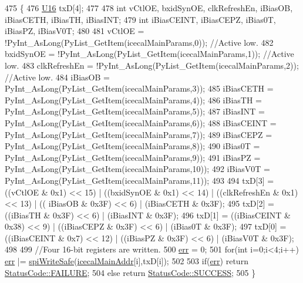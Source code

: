 \begin{DoxyCode}
475 \{                            
476     \hyperlink{ICECALv3_8h_adf928e51a60dba0df29d615401cc55a8}{U16} txD[4];
477 
478     \textcolor{keywordtype}{int} vCtlOE, bxidSynOE, clkRefreshEn, iBiasOB, iBiasCETH, iBiasTH, iBiasINT;
479     \textcolor{keywordtype}{int} iBiasCEINT, iBiasCEPZ, iBias0T, iBiasPZ, iBiasV0T;
480     
481     vCtlOE              = !PyInt\_AsLong(PyList\_GetItem(icecalMainParams,0));    \textcolor{comment}{//Active low.}
482     bxidSynOE       = !PyInt\_AsLong(PyList\_GetItem(icecalMainParams,1));    \textcolor{comment}{//Active low.}
483     clkRefreshEn    = !PyInt\_AsLong(PyList\_GetItem(icecalMainParams,2));    \textcolor{comment}{//Active low.}
484     iBiasOB         = PyInt\_AsLong(PyList\_GetItem(icecalMainParams,3));
485     iBiasCETH           = PyInt\_AsLong(PyList\_GetItem(icecalMainParams,4));
486     iBiasTH             = PyInt\_AsLong(PyList\_GetItem(icecalMainParams,5));
487     iBiasINT            = PyInt\_AsLong(PyList\_GetItem(icecalMainParams,6));
488     iBiasCEINT      = PyInt\_AsLong(PyList\_GetItem(icecalMainParams,7));
489     iBiasCEPZ       = PyInt\_AsLong(PyList\_GetItem(icecalMainParams,8));
490     iBias0T             = PyInt\_AsLong(PyList\_GetItem(icecalMainParams,9));
491     iBiasPZ             = PyInt\_AsLong(PyList\_GetItem(icecalMainParams,10));
492     iBiasV0T        = PyInt\_AsLong(PyList\_GetItem(icecalMainParams,11));
493 
494     txD[3] = ((vCtlOE & 0x1) << 15)         | ((bxidSynOE & 0x1) << 14) | ((clkRefreshEn & 0x1) << 13) | ((
      iBiasOB & 0x3F) << 6) | (iBiasCETH & 0x3F);
495     txD[2] = ((iBiasTH & 0x3F) << 6)        |  (iBiasINT  & 0x3F); 
496     txD[1] = ((iBiasCEINT & 0x38) << 9) | ((iBiasCEPZ & 0x3F) << 6) |  (iBias0T      & 0x3F);
497     txD[0] = ((iBiasCEINT & 0x7) << 12) | ((iBiasPZ   & 0x3F) << 6) |  (iBiasV0T     & 0x3F);
498 
499     \textcolor{comment}{//Four 16-bit registers are written.}
500     \hyperlink{classICECALv3_ad8989925ee5b3ff322d863ce6aaff0bd}{err} = 0;
501     \textcolor{keywordflow}{for}(\textcolor{keywordtype}{int} i=0;i<4;i++) \hyperlink{classICECALv3_ad8989925ee5b3ff322d863ce6aaff0bd}{err} |= \hyperlink{classICECALv3_aa0b8358ea0be8e47a8aded5e1551787f}{spiWriteSafe}(\hyperlink{ICECALv3_8h_a9c22ae782814495416dc2b803df326c1}{icecalMainAddr}[i],txD[i]);
502 
503     \textcolor{keywordflow}{if}(\hyperlink{classICECALv3_ad8989925ee5b3ff322d863ce6aaff0bd}{err}) \textcolor{keywordflow}{return} \hyperlink{classStatusCode_a6f565cbeadc76d14c72f047e5e85eb4ba3da73d4c469762eb9d3c960368252b26}{StatusCode::FAILURE};
504     \textcolor{keywordflow}{else}        \textcolor{keywordflow}{return} \hyperlink{classStatusCode_a6f565cbeadc76d14c72f047e5e85eb4badd0da38d3ba0d922efd1f4619bc37ad8}{StatusCode::SUCCESS};
505 \}
\end{DoxyCode}
\mbox{\label{classICECALv3_aae0b7539c0bba5311aab99e000d1be6d}} 
